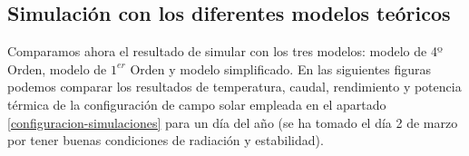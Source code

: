 \subsection{Simulación con los diferentes modelos teóricos}

Comparamos ahora el resultado de simular con los tres modelos: modelo de 4º Orden, modelo de $1^{er}$ Orden y modelo simplificado. En las siguientes figuras podemos comparar los resultados de temperatura, caudal, rendimiento y potencia térmica de la configuración de campo solar empleada en el apartado \ref{configuracion-simulaciones} para un día del año (se ha tomado el día 2 de marzo por tener buenas condiciones de radiación y estabilidad). 

\begin{table}[H]
\centering
\caption{Temperaturas obtenidas en la simulación con cada modelo teórico. Datos del día 2/3/2007. Condiciones estables y buena radiación}
\label{tab:temperaturas_modelos}
\end{table}
